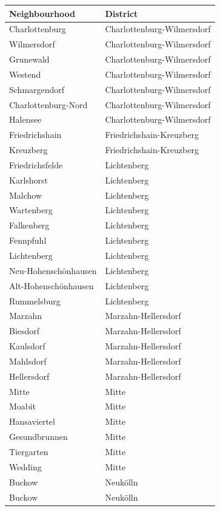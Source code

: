 \begin{table}[H]
\centering
\begin{tabular}{ll}
  \hline \hline
Neighbourhood & District \\ 
  \hline
Charlottenburg & Charlottenburg-Wilmersdorf \\ 
  Wilmersdorf & Charlottenburg-Wilmersdorf \\ 
  Grunewald & Charlottenburg-Wilmersdorf \\ 
  Westend & Charlottenburg-Wilmersdorf \\ 
  Schmargendorf & Charlottenburg-Wilmersdorf \\ 
  Charlottenburg-Nord & Charlottenburg-Wilmersdorf \\ 
  Halensee & Charlottenburg-Wilmersdorf \\ 
  Friedrichshain & Friedrichshain-Kreuzberg \\ 
  Kreuzberg & Friedrichshain-Kreuzberg \\ 
  Friedrichsfelde & Lichtenberg \\ 
  Karlshorst & Lichtenberg \\ 
  Malchow & Lichtenberg \\ 
  Wartenberg & Lichtenberg \\ 
  Falkenberg & Lichtenberg \\ 
  Fennpfuhl & Lichtenberg \\ 
  Lichtenberg & Lichtenberg \\ 
  Neu-Hohenschönhausen & Lichtenberg \\ 
  Alt-Hohenschönhausen & Lichtenberg \\ 
  Rummelsburg & Lichtenberg \\ 
  Marzahn & Marzahn-Hellersdorf \\ 
  Biesdorf & Marzahn-Hellersdorf \\ 
  Kaulsdorf & Marzahn-Hellersdorf \\ 
  Mahlsdorf & Marzahn-Hellersdorf \\ 
  Hellersdorf & Marzahn-Hellersdorf \\ 
  Mitte & Mitte \\ 
  Moabit & Mitte \\ 
  Hansaviertel & Mitte \\ 
  Gesundbrunnen & Mitte \\ 
  Tiergarten & Mitte \\ 
  Wedding & Mitte \\ 
  Buckow & Neukölln \\ 
  Buckow & Neukölln \\ 

\end{tabular}
\end{table}
